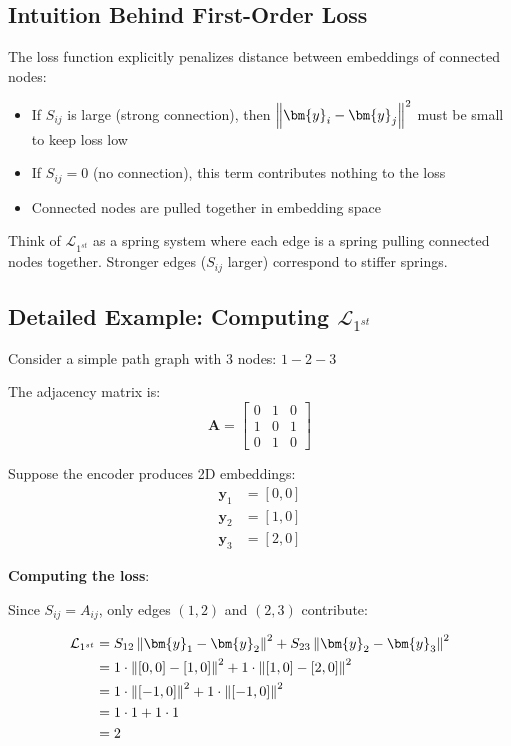 \begin{notechapter}
\subsection{Intuition Behind First-Order Loss}

The loss function explicitly penalizes distance between embeddings of connected nodes:

\begin{itemize}
    \item If $S_{ij}$ is large (strong connection), then $\norm{\bm{y}_i - \bm{y}_j}^2$ must be small to keep loss low
    \item If $S_{ij} = 0$ (no connection), this term contributes nothing to the loss
    \item Connected nodes are pulled together in embedding space
\end{itemize}

\begin{tcolorbox}[colback=yellow!5!white,colframe=yellow!75!black,title=Geometric Interpretation]
Think of $\mathcal{L}_{1^{st}}$ as a spring system where each edge is a spring pulling connected nodes together. Stronger edges ($S_{ij}$ larger) correspond to stiffer springs.
\end{tcolorbox}

\subsection{Detailed Example: Computing $\mathcal{L}_{1^{st}}$}

\begin{example}
Consider a simple path graph with 3 nodes: $1 - 2 - 3$

The adjacency matrix is:
\[
\bm{A} = \begin{bmatrix}
0 & 1 & 0 \\
1 & 0 & 1 \\
0 & 1 & 0
\end{bmatrix}
\]

Suppose the encoder produces 2D embeddings:
\begin{align*}
\bm{y}_1 &= [0, 0] \\
\bm{y}_2 &= [1, 0] \\
\bm{y}_3 &= [2, 0]
\end{align*}

\textbf{Computing the loss}:

Since $S_{ij} = A_{ij}$, only edges $(1,2)$ and $(2,3)$ contribute:

\begin{align*}
\mathcal{L}_{1^{st}} &= S_{12} \norm{\bm{y}_1 - \bm{y}_2}^2 + S_{23} \norm{\bm{y}_2 - \bm{y}_3}^2 \\
&= 1 \cdot \norm{[0,0] - [1,0]}^2 + 1 \cdot \norm{[1,0] - [2,0]}^2 \\
&= 1 \cdot \norm{[-1,0]}^2 + 1 \cdot \norm{[-1,0]}^2 \\
&= 1 \cdot 1 + 1 \cdot 1 \\
&= 2
\end{align*}


\end{example}
\end{notechapter}
